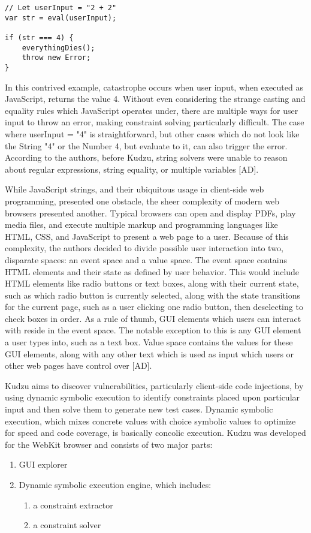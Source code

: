 \documentclass[11pt,expanded,copyright]{fsuthesis}
\begin{document}
\begin{lstlisting}[style=jsstyle]
// Let userInput = "2 + 2"
var str = eval(userInput); 

if (str === 4) {
	everythingDies();
	throw new Error;
}
\end{lstlisting}

In this contrived example, catastrophe occurs when user input, when executed as JavaScript, returns the value 4. Without even considering the strange casting and equality rules which JavaScript operates under, there are multiple ways for user input to throw an error, making constraint solving particularly difficult. The case where userInput = "4" is straightforward, but other cases which do not look like the String "4" or the Number 4, but evaluate to it, can also trigger the error. According to the authors, before Kudzu, string solvers were unable to reason about regular expressions, string equality, or multiple variables [AD].

While JavaScript strings, and their ubiquitous usage in client-side web programming, presented one obstacle, the sheer complexity of modern web browsers presented another. Typical browsers can open and display PDFs, play media files, and execute multiple markup and programming languages like HTML, CSS, and JavaScript to present a web page to a user. Because of this complexity, the authors decided to divide possible user interaction into two, disparate spaces: an event space and a value space. The event space contains HTML elements and their state as defined by user behavior. This would include HTML elements like radio buttons or text boxes, along with their current state, such as which radio button is currently selected, along with the state transitions for the current page, such as a user clicking one radio button, then deselecting to check boxes in order. As a rule of thumb, GUI elements which users can interact with reside in the event space. The notable exception to this is any GUI element a user types into, such as a text box. Value space contains the values for these GUI elements, along with any other text which is used as input which users or other web pages have control over [AD].

Kudzu aims to discover vulnerabilities, particularly client-side code injections, by using dynamic symbolic execution to identify constraints placed upon particular input and then solve them to generate new test cases. Dynamic symbolic execution, which mixes concrete values with choice symbolic values to optimize for speed and code coverage, is basically concolic execution. Kudzu was developed for the WebKit browser and consists of two major parts:
\begin{enumerate}
	\item GUI explorer
	\item Dynamic symbolic execution engine, which includes:
	\begin{enumerate}
		\item a constraint extractor
		\item a constraint solver
	\end{enumerate}
\end{enumerate}
\end{document}
